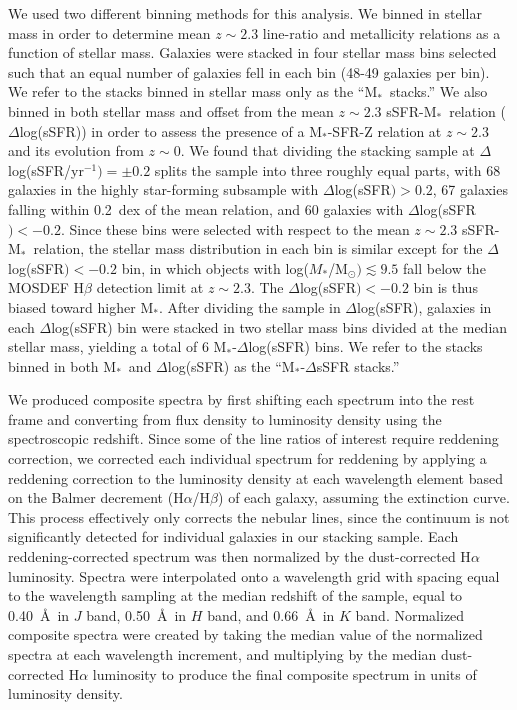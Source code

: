 \documentclass[iop,twocolappendix]{emulateapj}
\newcommand{\mstar}{$\mbox{M}_*$}
\begin{document}
We used two different binning methods for this analysis.  We binned in stellar mass in order to
 determine mean $z\sim2.3$ line-ratio and metallicity relations as a function of stellar mass.
  Galaxies were stacked in four stellar mass bins selected such that an equal number of galaxies
 fell in each bin (48-49 galaxies per bin).  We refer to the stacks binned in stellar mass
 only as the ``\mstar\ stacks.''
  We also binned in both stellar mass and offset from the mean $z\sim2.3$ sSFR-\mstar\ relation ($\Delta$log(sSFR))
 in order to assess the presence of a \mstar-SFR-Z relation at $z\sim2.3$ and its evolution from
 $z\sim0$.  We found that dividing the stacking sample at $\Delta$log(sSFR/yr$^{-1})=\pm0.2$ splits the
 sample into three roughly equal parts, with 68 galaxies in the highly star-forming subsample
 with $\Delta$log(sSFR$)>0.2$, 67 galaxies falling within 0.2~dex of the mean relation, and
 60 galaxies with $\Delta$log(sSFR$)<-0.2$.  Since these bins were selected with respect to
 the mean $z\sim2.3$ sSFR-\mstar\ relation, the stellar mass distribution in each bin is
 similar except for the $\Delta$log(sSFR$)<-0.2$ bin, in which objects with
 log($M_*$/M$_{\odot})\lesssim9.5$ fall below the MOSDEF H$\beta$ detection limit at $z\sim2.3$.
  The $\Delta$log(sSFR$)<-0.2$ bin is thus biased toward higher \mstar.
  After dividing the sample in $\Delta$log(sSFR), galaxies in each $\Delta$log(sSFR) bin were
 stacked in two stellar mass bins divided at the median stellar mass, yielding a total of 6
 \mstar-$\Delta$log(sSFR) bins.
  We refer to the stacks binned in both \mstar\ and $\Delta$log(sSFR) as the ``\mstar-$\Delta$sSFR stacks.''

We produced composite spectra by first shifting each spectrum into the rest frame and
 converting from flux density to luminosity density using the spectroscopic redshift.
  Since some of the line ratios of interest require reddening correction, we corrected
 each individual spectrum for reddening by applying a reddening correction to the luminosity
 density at each wavelength element based on the Balmer decrement (H$\alpha$/H$\beta$) of each galaxy,
 assuming the \citet{car89} extinction curve.
  This process effectively only corrects the nebular lines, since the continuum is not
 significantly detected for individual galaxies in our stacking sample.  Each reddening-corrected spectrum
 was then normalized by the dust-corrected H$\alpha$ luminosity.  Spectra were interpolated onto
 a wavelength grid with spacing equal to the wavelength sampling at the median redshift of
 the sample, equal to 0.40~\AA\ in $J$ band, 0.50~\AA\ in $H$ band, and 0.66~\AA\ in $K$ band.
  Normalized composite spectra were created by taking the median value of the normalized spectra at each
 wavelength increment, and multiplying by the median dust-corrected H$\alpha$ luminosity to produce
 the final composite spectrum in units of luminosity density.
\end{document}
